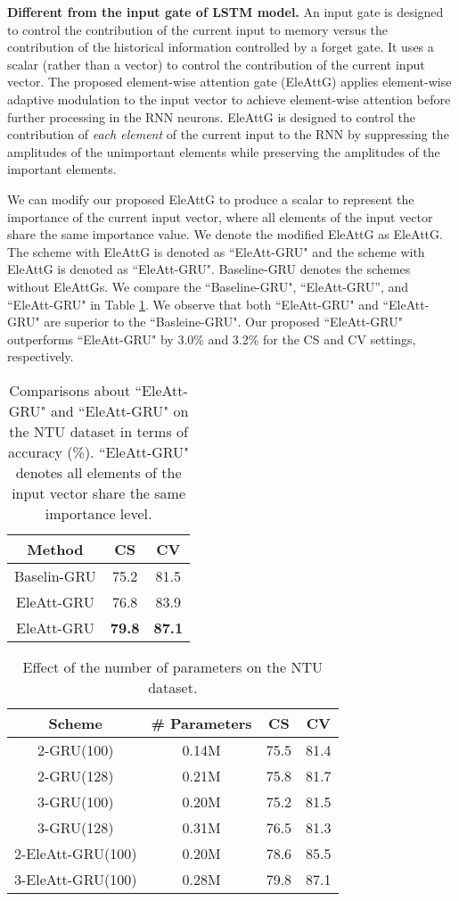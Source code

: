 \documentclass[journal]{IEEEtran}
\begin{document}
\textbf{Different from the input gate of LSTM model.}  An input gate is designed to control the contribution of the current input to memory versus the contribution of the historical information controlled by a forget gate. It uses a scalar (rather than a vector) to control the contribution of the current input vector. The proposed element-wise attention gate (EleAttG) applies element-wise adaptive modulation to the input vector to achieve element-wise attention before further processing in the RNN neurons. EleAttG is designed to control the contribution of {\emph{each element}} of the current input to the RNN by suppressing the amplitudes of the unimportant elements while preserving the amplitudes of the important elements.


We can modify our proposed EleAttG to produce a scalar to represent the importance of the current input vector, where all elements of the input vector share the same importance value. We denote the modified EleAttG as EleAttG. The scheme with EleAttG is denoted as ``EleAtt-GRU" and the scheme with EleAttG is denoted as ``EleAtt-GRU". Baseline-GRU denotes the schemes without EleAttGs. We compare the ``Baseline-GRU", ``EleAtt-GRU'', and  ``EleAtt-GRU" in Table \ref{tab:gate}. We observe that both ``EleAtt-GRU" and ``EleAtt-GRU" are superior to the ``Basleine-GRU". Our proposed ``EleAtt-GRU" outperforms ``EleAtt-GRU" by 3.0\% and 3.2\% for the CS and CV settings, respectively.


\setlength{\tabcolsep}{6pt}
\begin{table}[!]
  \centering
  \caption{Comparisons about ``EleAtt-GRU" and ``EleAtt-GRU" on the NTU dataset in terms of accuracy (\%).  ``EleAtt-GRU" denotes all elements of the input vector share the same importance level.}
    \begin{tabular}{ccc}
    \toprule
    Method & CS  & CV \\
    \midrule
    Baselin-GRU & 75.2 & 81.5 \\
    EleAtt-GRU & 76.8 & 83.9 \\
    EleAtt-GRU & \textbf{79.8} & \textbf{87.1} \\
    \bottomrule
    \end{tabular}
  \label{tab:gate}
\end{table}

\setlength{\tabcolsep}{6pt}
\begin{table}[t]
	\centering
	\caption{Effect of the number of parameters  on the NTU dataset.}
	\begin{tabular}{cccc}
		\toprule
		Scheme & \# Parameters & CS    & CV \\
		\midrule
		2-GRU(100) & 0.14M & 75.5  & 81.4  \\
		2-GRU(128) & 0.21M & 75.8 & 81.7 \\
		3-GRU(100) & 0.20M & 75.2  & 81.5  \\
		3-GRU(128) & 0.31M & 76.5  & 81.3  \\
		2-EleAtt-GRU(100) & 0.20M & 78.6  & 85.5 \\
		3-EleAtt-GRU(100) & 0.28M & 79.8  & 87.1  \\
		\bottomrule
	\end{tabular}
	\label{tab:params}
\end{table}
\end{document}
